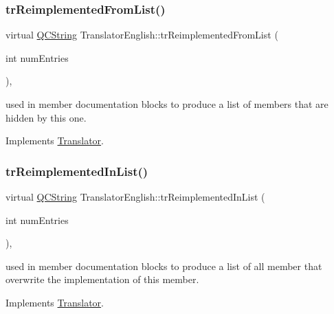 \subsubsection{\texorpdfstring{trReimplementedFromList()}{trReimplementedFromList()}}
{\footnotesize\ttfamily virtual \mbox{\hyperlink{class_q_c_string}{Q\+C\+String}} Translator\+English\+::tr\+Reimplemented\+From\+List (\begin{DoxyParamCaption}\item[{int}]{num\+Entries }\end{DoxyParamCaption})\hspace{0.3cm}{\ttfamily [inline]}, {\ttfamily [virtual]}}

used in member documentation blocks to produce a list of members that are hidden by this one. 

Implements \mbox{\hyperlink{class_translator}{Translator}}.

\mbox{\label{class_translator_english_a87e9bfedbec853941ebba31da3417b99}} 
\subsubsection{\texorpdfstring{trReimplementedInList()}{trReimplementedInList()}}
{\footnotesize\ttfamily virtual \mbox{\hyperlink{class_q_c_string}{Q\+C\+String}} Translator\+English\+::tr\+Reimplemented\+In\+List (\begin{DoxyParamCaption}\item[{int}]{num\+Entries }\end{DoxyParamCaption})\hspace{0.3cm}{\ttfamily [inline]}, {\ttfamily [virtual]}}

used in member documentation blocks to produce a list of all member that overwrite the implementation of this member. 

Implements \mbox{\hyperlink{class_translator}{Translator}}.

\mbox{\label{class_translator_english_ad53ad029544ddadb246a07d95584a9a2}} 
